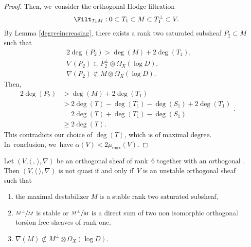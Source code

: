 \begin{proof}
Then, we~consider the orthogonal Hodge filtration
\[
\Filt_{T_1M}:0\subset T_1\subset M\subset T_1^\perp \subset V.
\]
By Lemma \ref{degreeincreasing}, there exists a rank two saturated subsheaf $P_2 \subset M$ such that
\begin{align*}
& 2\deg(P_2)>\deg(M)+2\deg(T_1), \\
& \nabla(P_2)\subset P_2^\perp\otimes\Omega_X(\log D), \\
& \nabla(P_2)\not\subset M\otimes\Omega_X(\log D).
\end{align*}
Then,
\begin{equation*}
\begin{split}
2\deg(P_2)&>\deg(M)+2\deg(T_1)\\
&>2\deg(T)-\deg(T_1)-\deg(S_1)+2\deg(T_1)\\
&=2\deg(T)+\deg(T_1)-\deg(S_1)\\
&\geq 2\deg(T).
\end{split}.
\end{equation*}
This contradicts our choice of $\deg(T)$, which is of maximal degree. In~conclusion, we~have $\alpha(V)<2\mu_{\max}(V)$.
\end{proof}


\begin{prop}\label{classfication6}
Let $(V,\langle \,, \, \rangle,\nabla)$ be an orthogonal sheaf of rank~$6$ together with an orthogonal \lconnection. Then $(V,\langle \ \rangle,\nabla)$ is not quasi \grsemistable if and only if~$V$ is an unstable orthogonal sheaf such that
\begin{enumerate}
\item the maximal destabilizer $M$ is a stable rank two saturated subsheaf,
\item $\sfrac{M^\perp}{M}$ is stable or $\sfrac{M^\perp}{M}$ is a direct sum of two non isomorphic orthogonal torsion free sheaves of rank one,
\item $\nabla(M)\not\subset M^\perp\otimes\Omega_X(\log D)$.
\end{enumerate}
\end{prop}

